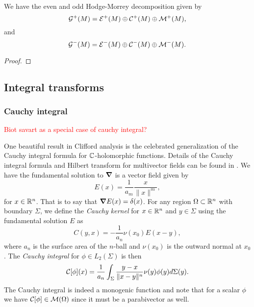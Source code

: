 \begin{theorem}
We have the even and odd Hodge-Morrey decomposition given by
\begin{equation}
\mathcal{G}^+(M) = \mathcal{E}^{+}(M) \oplus \mathcal{C}^{+}(M) \oplus \mathcal{M}^{+}(M),
\end{equation}
and
\begin{equation}
\mathcal{G}^-(M) = \mathcal{E}^{-}(M) \oplus \mathcal{C}^{-}(M) \oplus \mathcal{M}^{-}(M).
\end{equation}
\end{theorem}
\begin{proof}

\end{proof}

\subsection{Integral transforms}
\label{subsec:integral_transforms}

\subsubsection{Cauchy integral}

\textcolor{red}{Biot savart as a special case of cauchy integral?}

One beautiful result in Clifford analysis is the celebrated generalization of the Cauchy integral formula for $\mathbb{C}$-holomorphic functions. Details of the Cauchy integral formula and Hilbert transform for multivector fields can be found in \cite{brackx_hilbert_2008}. We have the fundamental solution to $\boldsymbol{\nabla}$ is a vector field given by
\[
E(x) = \frac{1}{a_m} \frac{x}{\|x\|^m},
\]
for $x\in \mathbb{R}^n$. That is to say that $\boldsymbol{\nabla} E(x) = \delta(x)$. For any region $\Omega \subset \mathbb{R}^n$ with boundary $\Sigma$, we define the \emph{Cauchy kernel} for $x\in \mathbb{R}^n$ and $y \in \Sigma$ using the fundamental solution $E$ as
\[
C(y, x) = -\frac{1}{a_n} \nu(x_0) E(x-y),
\]
where $a_n$ is the surface area of the $n$-ball and $\nu(x_0)$ is the outward normal at $x_0$. The \emph{Cauchy integral} for $\phi \in L_2(\Sigma)$ is then
\[
\mathcal{C}[\phi](x) = \frac{1}{a_n} \int_{\Sigma} \frac{y-x}{\|x-y\|^n} \nu(y) \phi(y) d\Sigma(y).
\]
The Cauchy integral is indeed a monogenic function and note that for a scalar $\phi$ we have $\mathcal{C}[\phi] \in \mathcal{M}(\Omega)$ since it must be a parabivector as well.
